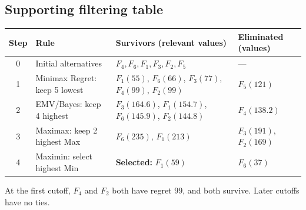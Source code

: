 \subsection*{Supporting filtering table}
\begin{center}\small
\begin{tabularx}{\textwidth}{@{}c >{\raggedright\arraybackslash}p{} >{\raggedright\arraybackslash}X >{\raggedright\arraybackslash}p{}@{}}
\toprule
Step & Rule & Survivors (relevant values) & Eliminated (values)\\\midrule
0 & Initial alternatives & $F_4,F_6,F_1,F_3,F_2,F_5$ & ---\\
1 & Minimax Regret: keep 5 lowest & $F_1(55)$, $F_6(66)$, $F_3(77)$, $F_4(99)$, $F_2(99)$ & $F_5(121)$\\
2 & EMV/Bayes: keep 4 highest & $F_3(164.6)$, $F_1(154.7)$, $F_6(145.9)$, $F_2(144.8)$ & $F_4(138.2)$\\
3 & Maximax: keep 2 highest Max & $F_6(235)$, $F_1(213)$ & $F_3(191)$, $F_2(169)$\\
4 & Maximin: select highest Min & \textbf{Selected:} $F_1(59)$ & $F_6(37)$\\
\bottomrule\end{tabularx}
\end{center}
At the first cutoff, $F_4$ and $F_2$ both have regret 99, and both survive. Later cutoffs have no ties.
\secInicio[sec:q4]

\label{sol:q4tree}
